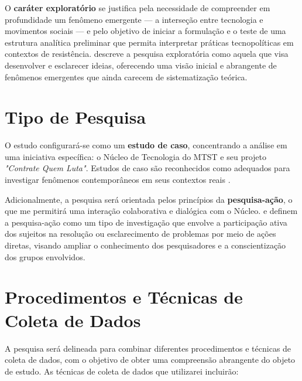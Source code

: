 O \textbf{caráter exploratório} se justifica pela necessidade de compreender em profundidade um fenômeno emergente — a interseção entre tecnologia e movimentos sociais — e pelo objetivo de iniciar a formulação e o teste de uma estrutura analítica preliminar que permita interpretar práticas tecnopolíticas em contextos de resistência.  descreve a pesquisa exploratória como aquela que visa desenvolver e esclarecer ideias, oferecendo uma visão inicial e abrangente de fenômenos emergentes que ainda carecem de sistematização teórica.

\section{Tipo de Pesquisa}

O estudo configurará-se como um \textbf{estudo de caso}, concentrando a análise em uma iniciativa específica: o Núcleo de Tecnologia do MTST e seu projeto \textit{"Contrate Quem Luta"}. Estudos de caso são reconhecidos como adequados para investigar fenômenos contemporâneos em seus contextos reais \cite{menezes2019}.

Adicionalmente, a pesquisa será orientada pelos princípios da \textbf{pesquisa-ação}, o que me permitirá uma interação colaborativa e dialógica com o Núcleo.  e  definem a pesquisa-ação como um tipo de investigação que envolve a participação ativa dos sujeitos na resolução ou esclarecimento de problemas por meio de ações diretas, visando ampliar o conhecimento dos pesquisadores e a conscientização dos grupos envolvidos.

\section{Procedimentos e Técnicas de Coleta de Dados}

A pesquisa será delineada para combinar diferentes procedimentos e técnicas de coleta de dados, com o objetivo de obter uma compreensão abrangente do objeto de estudo. As técnicas de coleta de dados que utilizarei incluirão:

